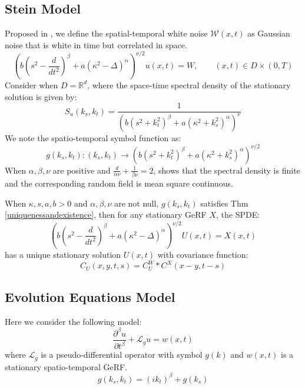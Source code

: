\subsection{Stein Model}
Proposed in \cite{stein2005space}, we define the spatial-temporal white noise $\mathcal{W}(x,t)$ as Gaussian noise that is white in time but correlated in space.
\begin{equation}\label{SteinModel}
	\left(b(s^2-\frac{d}{dt^2})^\beta + a(\kappa^2-\Delta)^\alpha\right)^{\nu / 2}u(x,t) = W,\qquad (x, t)\in D\times (0, T)
\end{equation}
Consider when $D = \mathbb{R}^d$, where the space-time spectral density of the stationary solution is given by:
\begin{equation}
	S_u(k_s, k_t) = \frac{1}{(b(s^2 + k_t^2)^\beta + a(\kappa^2 + k_s^2)^\alpha)^\nu}
\end{equation}
We note the spatio-temporal symbol function as:
\begin{equation}
	g(k_s, k_t): (k_s, k_t)\rightarrow (b(s^2 + k_t^2)^\beta + a(\kappa^2 + k_s^2)^\alpha)^{\nu/2}
\end{equation}
When $\alpha, \beta, \nu$ are positive and $\frac{d}{\alpha\nu}+\frac{1}{\beta\nu} = 2$, 
\cite{stein2005space} shows that the spectral density is finite and the corresponding random field is mean square continuous.

\begin{theorem}
	When $\kappa, s, a, b>0$ and $\alpha, \beta, \nu$ are not null, $g(k_s, k_t)$ satisfies Thm \ref{uniquenessandexistence}, 
then for any stationary GeRF $X$, the SPDE:
\begin{equation}
	\left(b(s^2-\frac{d}{dt^2})^\beta + a(\kappa^2-\Delta)^\alpha\right)^{\nu / 2}U(x,t) = X(x,t)
\end{equation}
has a unique stationary solution $U(x,t)$ with covariance function:
\begin{equation}
	C_U(x, y, t, s) = C_U^W*C^X(x-y, t-s)
\end{equation}
\end{theorem}

\subsection{Evolution Equations Model}
Here we consider the following model:
\begin{equation}
	\frac{\partial^\beta u}{\partial t^\beta} + \mathcal{L}_gu = w(x,t)
\end{equation}
where $\mathcal{L}_g$ is a pseudo-differential operator with symbol $g(k)$ and $w(x,t)$ is a stationary spatio-temporal GeRF.
\begin{equation}
	g(k_s, k_t) = (ik_t)^\beta + g(k_s)
\end{equation}

